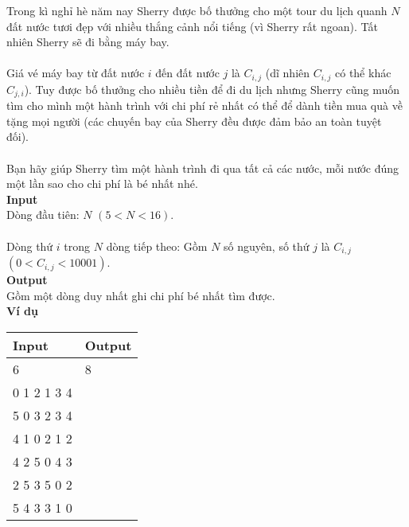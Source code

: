 Trong kì nghỉ hè năm nay Sherry được bố thưởng cho một tour du lịch quanh $N$ đất nước tươi đẹp với nhiều thắng cảnh nổi tiếng (vì Sherry rất ngoan). Tất nhiên Sherry sẽ đi bằng máy bay.
\\
\\
Giá vé máy bay từ đất nước $i$ đến đất nước $j$ là $C_{i,j}$ (dĩ nhiên $C_{i,j}$ có thể khác $C_{j,i}$). Tuy được bố thưởng cho nhiều tiền để đi du lịch nhưng Sherry cũng muốn tìm cho mình một hành trình với chi phí rẻ nhất có thể để dành tiền mua quà về tặng mọi người (các chuyến bay của Sherry đều được đảm bảo an toàn tuyệt đối).
\\
\\
Bạn hãy giúp Sherry tìm một hành trình đi qua tất cả các nước, mỗi nước đúng một lần sao cho chi phí là bé nhất nhé.
\\

\textbf{Input}
\\
Dòng đầu tiên: $N$ $(5 < N < 16)$.
\\
\\
Dòng thứ $i$ trong $N$ dòng tiếp theo: Gồm $N$ số nguyên, số thứ $j$ là $C_{i,j}$ $(0 < C_{i,j} < 10001)$.
\\

\textbf{Output}
\\
Gồm một dòng duy nhất ghi chi phí bé nhất tìm được.
\\

\textbf{Ví dụ}
\begin{table}[h!]
    \begin{center}
        \begin{tabular}{|p{7cm}|p{5cm}|}
            \hline
            \textbf{Input} & \textbf{Output} \\ 
            \hline
            6 & 8 \\
            0 1 2 1 3 4  & \\
            5 0 3 2 3 4 & \\
            4 1 0 2 1 2 & \\
            4 2 5 0 4 3 & \\
            2 5 3 5 0 2  & \\
            5 4 3 3 1 0  & \\
            \hline
        \end{tabular}
    \end{center}
\end{table}



